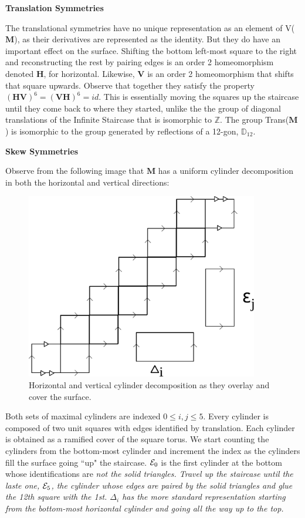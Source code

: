 \documentclass[]{article}
\begin{document}
\vspace{0.1in}

\noindent\textbf{Translation Symmetries}

The translational symmetries have no unique representation as an element of V($\mathbf M$), as their derivatives are represented as the identity. But they do have an important effect on the surface. Shifting the bottom left-most square to the right and reconstructing the rest by pairing edges is an order 2 homeomorphism denoted $\mathbf{H}$, for horizontal. Likewise, $\mathbf{V}$ is an order 2 homeomorphism that shifts that square upwards. Observe that together they satisfy the property $(\mathbf{H}\mathbf{V})^{6}=(\mathbf{V}\mathbf{H})^{6}=id$. This is essentially moving the squares up the staircase until they come back to where they started, unlike the the group of diagonal translations of the Infinite Staircase that is isomorphic to $\mathbb Z$. The group Trans($\mathbf M$) is isomorphic to the group generated by reflections of a 12-gon, $\mathbb{D}_{12}$.

\vspace{0.1in}

\noindent\textbf{Skew Symmetries}

Observe from the following image that $\mathbf M$ has a uniform cylinder decomposition in both the horizontal and vertical directions:

\begin{figure}[H]
\centering
\includegraphics[width=4in]{cylinderdecomp.pdf}
\caption{Horizontal and vertical cylinder decomposition as they overlay and cover the surface.}
\label{fig:decomp}
\end{figure}

Both sets of maximal cylinders are indexed $0\leq i, j \leq 5$. Every cylinder is composed of two unit squares with edges identified by translation. Each cylinder is obtained as a ramified cover of the square torus. We start counting the cylinders from the bottom-most cylinder and increment the index as the cylinders fill the surface going ``up" the staircase. $\small{\mathcal{E}}_0$ is the first cylinder at the bottom whose identifications are \em{not} \normalfont the solid triangles. Travel up the staircase until the laste one, $\small{\mathcal{E}}_5$, the cylinder whose edges are paired by the solid triangles and glue the 12th square with the 1st. $\Delta_{i}$ has the more standard representation starting from the bottom-most horizontal cylinder and going all the way up to the top. 
\end{document}
